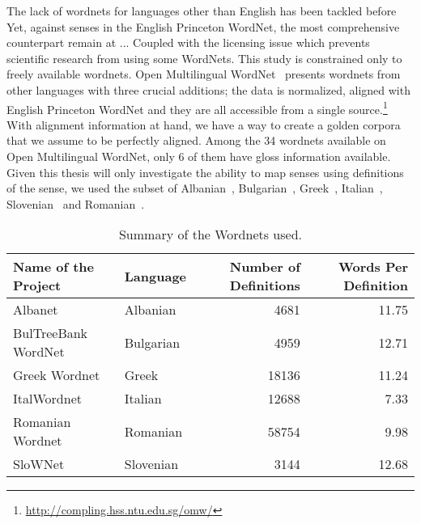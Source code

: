 The lack of wordnets for languages other than English has been tackled before %
Yet, against %
senses in the English Princeton WordNet, the most comprehensive counterpart remain at ... %
Coupled with the licensing issue which prevents scientific research from using some WordNets.
This study is constrained only to freely available wordnets.
Open Multilingual WordNet~\cite{bond_survey_2012} presents wordnets from other languages with three crucial additions; %
the data is normalized, aligned with English Princeton WordNet and they are all accessible from a single source.\footnote{\url{http://compling.hss.ntu.edu.sg/omw/}}
With alignment information at hand, we have a way to create a golden corpora that we assume to be perfectly aligned.
Among the 34 wordnets available on Open Multilingual WordNet, only 6 of them have gloss information available.
Given this thesis will only investigate the ability to map senses using definitions of the sense, we used the subset of Albanian~\cite{ruci_current_2008}, Bulgarian~\cite{simov_constructing_2010}, Greek~\cite{stamou_exploring_2004}, Italian~\cite{pianta_multiwordnet_2002}, Slovenian~\cite{fiser_slownet_2012} and Romanian~\cite{tufis_romanian_2008}.
\begin{table*}[!hbp]
    \begin{center}
        \caption{Summary of the Wordnets used.}\label{tab:summary_table}
        \begin{tabular}{llrr}
            \toprule%
            \textbf{Name of the Project} & \textbf{Language} & \textbf{Number of Definitions} & \textbf{Words Per Definition} \\
            \midrule%
            Albanet & Albanian & 4681 & 11.75 \\
            BulTreeBank WordNet & Bulgarian & 4959 & 12.71 \\
            Greek Wordnet & Greek & 18136 & 11.24 \\
            ItalWordnet & Italian & 12688 & 7.33 \\
            Romanian Wordnet & Romanian & 58754 & 9.98 \\
            SloWNet & Slovenian & 3144 & 12.68 \\
            \bottomrule %
        \end{tabular}
    \end{center}
\end{table*}

